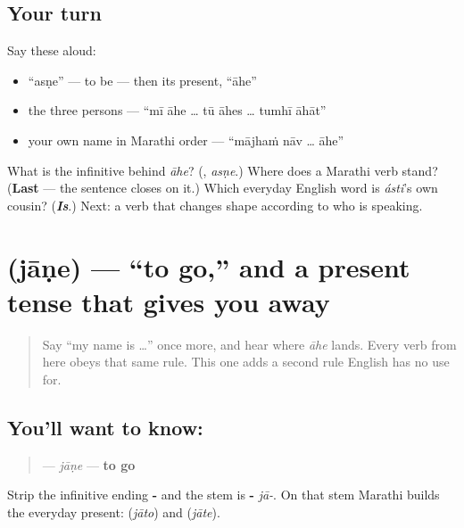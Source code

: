 \subsection*{Your turn}
Say these aloud:

\begin{itemize}
\raggedright
  \item \textquotedblleft{}asṇe\textquotedblright{} — to be — then its present, \textquotedblleft{}āhe\textquotedblright{}
  \item the three persons — \textquotedblleft{}mī āhe … tū āhes … tumhī āhāt\textquotedblright{}
  \item your own name in Marathi order — \textquotedblleft{}mājhaṁ nāv … āhe\textquotedblright{}
\end{itemize}

\begin{tcolorbox}[breakable,colback=teal!4,colframe=teal!35!black,title={Before you move on}]
What is the infinitive behind \emph{āhe}? (\textbf{}, \emph{asṇe}.) Where does a Marathi verb stand? (\textbf{Last} — the sentence closes on it.) Which everyday English word is \emph{ásti}'s own cousin? (\emph{\textbf{Is}}.) Next: a verb that changes shape according to who is speaking.
\end{tcolorbox}
\section[jāṇe]{ (jāṇe) — \textquotedblleft{}to go,\textquotedblright{} and a present tense that gives you away}

\label{lesson:MR-C07-jane}



\begin{quote}
Say \textquotedblleft{}my name is …\textquotedblright{} once more, and hear where \emph{āhe} lands. Every verb from here obeys that same rule. This one adds a second rule English has no use for.
\end{quote}

\subsection*{You'll want to know: }
\begin{quote}
\textbf{} — \emph{jāṇe} — \textbf{to go}
\end{quote}

Strip the infinitive ending \textbf{-} and the stem is \textbf{-} \emph{jā-}. On that stem Marathi builds the everyday present: \textbf{} (\emph{jāto}) and \textbf{} (\emph{jāte}).

